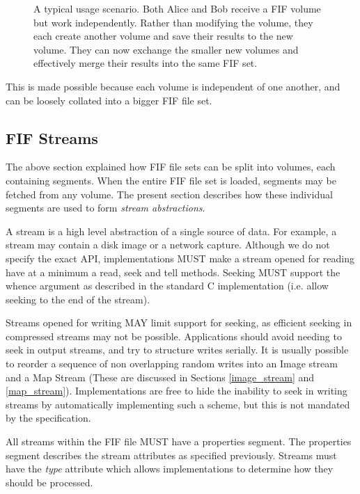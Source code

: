 \documentclass[10pt, conference]{IEEEtran}
\begin{document}
\begin{figure}[tb]
  \begin{center}
  \mbox{\columnwidth {}}

  \caption{A typical usage scenario. Both Alice and Bob receive a FIF
  volume but work independently. Rather than modifying the volume,
  they each create another volume and save their results to the new
  volume. They can now exchange the smaller new volumes and
  effectively merge their results into the same FIF set.}

  \label{usage}
  \end{center}
\end{figure}

This is made possible because each volume is independent of one
another, and can be loosely collated into a bigger FIF file
set.

\subsection{FIF Streams}
The above section explained how FIF file sets can be split into
volumes, each containing segments. When the entire FIF file set is
loaded, segments may be fetched from any volume. The present section
describes how these individual segments are used to form {\em stream
abstractions}.

A stream is a high level abstraction of a single source of data. For
example, a stream may contain a disk image or a network
capture. Although we do not specify the exact API, implementations
MUST make a stream opened for reading have at a minimum a read, seek
and tell methods. Seeking MUST support the whence argument as
described in the standard C implementation (i.e. allow seeking to the
end of the stream).

Streams opened for writing MAY limit support for seeking, as efficient
seeking in compressed streams may not be possible. Applications should
avoid needing to seek in output streams, and try to structure writes
serially. It is usually possible to reorder a sequence of non
overlapping random writes into an Image stream and a Map Stream (These
are discussed in Sections \ref{image_stream} and
\ref{map_stream}). Implementations are free to hide the inability to
seek in writing streams by automatically implementing such a scheme,
but this is not mandated by the specification.

All streams within the FIF file MUST have a properties segment. The
properties segment describes the stream attributes as specified
previously. Streams must have the {\em type} attribute which allows
implementations to determine how they should be processed. 
\end{document}
